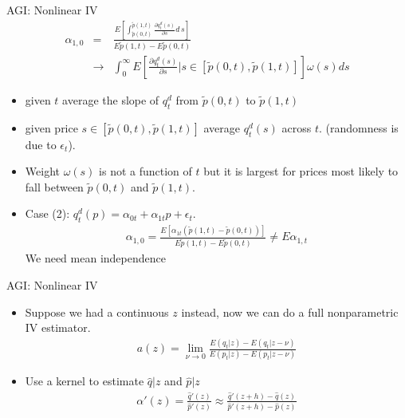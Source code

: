 \documentclass[xcolor=pdftex,dvipsnames,table,mathserif,aspectratio=169]{beamer}
\begin{document}
\begin{frame}{AGI: Nonlinear IV}
\vspace{-0.25cm}
\begin{eqnarray*}
\alpha_{1,0} &=& \frac{E [ \int_{\tilde{p}(0,t)}^{\tilde{p}(1,t)} \frac{\partial q_t^d(s)}{\partial s} d\, s]}{E \tilde{p}(1,t)- E\tilde{p}(0,t)}\\
 &\rightarrow& \int_0^{\infty} E\left[ \frac{\partial q_t^d(s)}{\partial s} | s \in [\tilde{p}(0,t),\tilde{p}(1,t)]\right ] \omega(s) d  s
\end{eqnarray*}
\vspace{-1cm}
\begin{itemize}
\item given $t$ average the slope of $q_t^d$ from $\tilde{p}(0,t)$ to $\tilde{p}(1,t)$
\item given price $s \in [\tilde{p}(0,t) ,\tilde{p}(1,t)]$ average $q_t^d(s)$ across $t$. (randomness is due to $\epsilon_t$).
\item Weight $\omega(s)$ is not a function of $t$ but it is largest for prices most likely to fall between $\tilde{p}(0,t)$ and $\tilde{p}(1,t)$.
\item Case (2): $q_t^d(p) = \alpha_{0t} + \alpha_{1t} p + \epsilon_t$.
\vspace{-0.25cm}
\begin{eqnarray*}
\alpha_{1,0} = \frac{E[\alpha_{1t} (\tilde{p}(1,t) - \tilde{p}(0,t))]}{E \tilde{p}(1,t) - E \tilde{p}(0,t)} \neq E \alpha_{1,t}
\end{eqnarray*}
\vspace{-0.75cm}
We need mean independence
\end{itemize}
\end{frame}


\begin{frame}{AGI: Nonlinear IV}
\begin{itemize}
\item Suppose we had a continuous $z$ instead, now we can do a full nonparametric IV estimator.
\begin{eqnarray*}
a(z) = \lim_{\nu \rightarrow 0} \frac{E(q_t | z) - E(q_t | z-\nu)}{E(p_t | z) - E(p_t | z- \nu)}
\end{eqnarray*}
\item Use a kernel to estimate $\hat{q}|z$ and $\hat{p}|z$
\begin{eqnarray*}
\alpha'(z) =\frac{\hat{q}'(z)}{\hat{p}'(z)} \approx \frac{\hat{q}'(z+h) - \hat{q}(z)}{\hat{p}'(z+h) - \hat{p}(z)}
\end{eqnarray*}
\end{itemize}
\end{frame}
\end{document}
